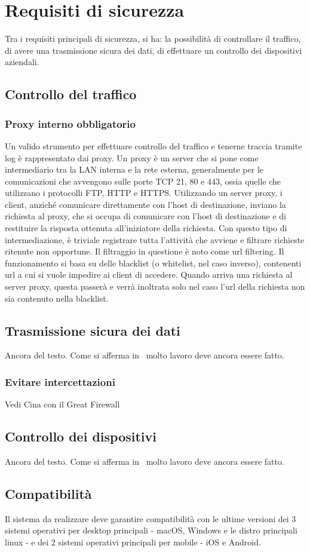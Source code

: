 \section{Requisiti di sicurezza}
Tra i requisiti principali di sicurezza, si ha: la possibilità di controllare il traffico, di avere una trasmissione sicura dei dati, di effettuare un controllo dei dispositivi aziendali.

\subsection{Controllo del traffico}
\subsubsection{Proxy interno obbligatorio}
Un valido strumento per effettuare controllo del traffico e tenerne traccia tramite log è rappresentato dai proxy.
Un proxy è un server che si pone come intermediario tra la LAN interna e la rete esterna, generalmente per le comunicazioni che avvengono sulle porte TCP 21, 80 e 443, ossia quelle che utilizzano i protocolli FTP, HTTP e HTTPS.
Utilizzando un server proxy, i client, anziché comunicare direttamente con l'host di destinazione, inviano la richiesta al proxy, che si occupa di comunicare con l'host di destinazione e di restituire la risposta ottenuta all'iniziatore della richiesta.
Con questo tipo di intermediazione, è triviale registrare tutta l'attività che avviene e filtrare richieste ritenute non opportune.
Il filtraggio in questione è noto come url filtering. Il funzionamento si basa su delle blacklist (o whitelist, nel caso inverso), contenenti url a cui si vuole impedire ai client di accedere. Quando arriva una richiesta al server proxy, questa passerà e verrà inoltrata solo nel caso l'url della richiesta non sia contenuto nella blacklist.

\subsection{Trasmissione sicura dei dati}
Ancora del testo. Come si afferma in~\cite{jones96analysis} molto lavoro deve ancora essere fatto.
\subsubsection{Evitare intercettazioni}
Vedi Cina con il Great Firewall

\subsection{Controllo dei dispositivi}
Ancora del testo. Come si afferma in~\cite{jones96analysis} molto lavoro deve ancora essere fatto.

\subsection{Compatibilità}
Il sistema da realizzare deve garantire compatibilità con le ultime versioni dei 3 sistemi operativi per desktop principali - macOS, Windows e le distro principali linux -  e dei 2 sistemi operativi principali per mobile - iOS e Android.